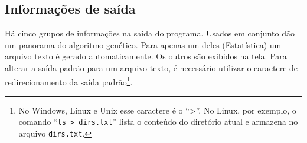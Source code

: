 \subsection{Informações de saída}
		
Há cinco grupos de informações na saída do programa. Usados em conjunto dão um panorama do algoritmo genético. Para apenas um deles (Estatística) um arquivo texto é gerado automaticamente. Os outros são exibidos na tela. Para alterar a saída padrão para um arquivo texto, é necessário utilizar o caractere de redirecionamento da saída padrão\footnote{No Windows, Linux e Unix esse caractere é o ``>''. No Linux, por exemplo, o comando ``\texttt{ls > dirs.txt}'' lista o conteúdo do diretório atual e armazena no arquivo \texttt{dirs.txt}.}.

